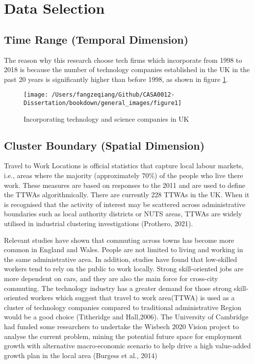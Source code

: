 \documentclass[
  12pt,
  oneside]{book}
\begin{document}
\hypertarget{data-selection}{%
\section{Data Selection}\label{data-selection}}

\hypertarget{time-range-temporal-dimension}{%
\subsection{Time Range (Temporal Dimension)}\label{time-range-temporal-dimension}}

The reason why this research choose tech firms which incorporate from 1998 to 2018 is because the number of technology companies established in the UK in the past 20 years is significantly higher than before 1998, as shown in figure \ref{fig:fig-1}.

\begin{figure}
\texttt{[image: /Users/fangzeqiang/Github/CASA0012-Dissertation/bookdown/general\_images/figure1]} \caption{Incorporating technology and science companies in UK}\label{fig:fig-1}
\end{figure}

\hypertarget{cluster-boundary-spatial-dimension}{%
\subsection{Cluster Boundary (Spatial Dimension)}\label{cluster-boundary-spatial-dimension}}

Travel to Work Locations is official statistics that capture local labour markets, i.e., areas where the majority (approximately 70\%) of the people who live there work. These measures are based on responses to the 2011 and are used to define the TTWAs algorithmically. There are currently 228 TTWAs in the UK. When it is recognised that the activity of interest may be scattered across administrative boundaries such as local authority districts or NUTS areas, TTWAs are widely utilised in industrial clustering investigations (Prothero, 2021).

Relevant studies have shown that commuting across towns has become more common in England and Wales. People are not limited to living and working in the same administrative area. In addition, studies have found that low-skilled workers tend to rely on the public to work locally. Strong skill-oriented jobs are more dependent on cars, and they are also the main force for cross-city commuting. The technology industry has a greater demand for those strong skill-oriented workers which suggest that travel to work area(TTWA) is used as a cluster of technology companies compared to traditional administrative Region would be a good choice (Titheridge and Hall,2006). The University of Cambridge had funded some researchers to undertake the Wisbech 2020 Vision project to analyse the current problem, mining the potential future space for employment growth with alternative macro-economic scenario to help drive a high value-added growth plan in the local area (Burgess et al., 2014)
\end{document}
